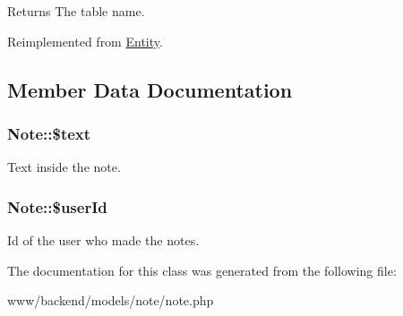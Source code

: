 \begin{DoxyReturn}{Returns}
The table name. 
\end{DoxyReturn}


Reimplemented from \hyperlink{classEntity_a8305fd94740ac62cbafb9de76567ce37}{Entity}.



\subsection{Member Data Documentation}
\hypertarget{classNote_ae670c2f241d1653966e68b2f3b8ecbaf}{
\subsubsection[{\$text}]{\setlength{\rightskip}{0pt plus 5cm}Note::\$text}}
\label{classNote_ae670c2f241d1653966e68b2f3b8ecbaf}
Text inside the note. \hypertarget{classNote_a98ea63ab026014b1d8d2f1531a2a481e}{
\subsubsection[{\$userId}]{\setlength{\rightskip}{0pt plus 5cm}Note::\$userId}}
\label{classNote_a98ea63ab026014b1d8d2f1531a2a481e}
Id of the user who made the notes. 

The documentation for this class was generated from the following file:\begin{DoxyCompactItemize}
\item 
www/backend/models/note/note.php\end{DoxyCompactItemize}
